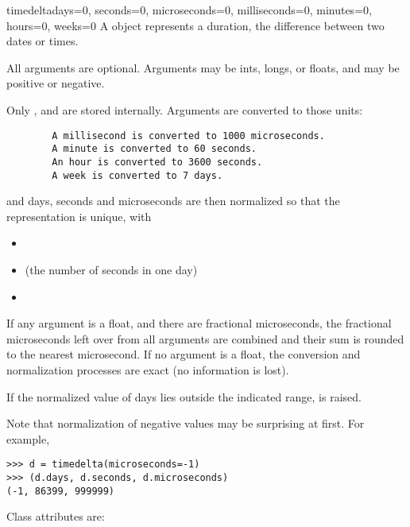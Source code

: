 \begin{classdesc}{timedelta}{days=0, seconds=0, microseconds=0,
                            milliseconds=0, minutes=0, hours=0, weeks=0}
A  object represents a duration, the difference
between two dates or times.

    All arguments are optional.  Arguments may be ints, longs, or floats,
    and may be positive or negative.

    Only ,  and  are stored
    internally.  Arguments are converted to those units:

\begin{verbatim}
        A millisecond is converted to 1000 microseconds.
        A minute is converted to 60 seconds.
        An hour is converted to 3600 seconds.
        A week is converted to 7 days.
\end{verbatim}

    and days, seconds and microseconds are then normalized so that the
    representation is unique, with

\begin{itemize}
  \item {}
  \item {} (the number of seconds in one day)
  \item {}
\end{itemize}

    If any argument is a float, and there are fractional microseconds,
    the fractional microseconds left over from all arguments are combined
    and their sum is rounded to the nearest microsecond.  If no
    argument is a float, the conversion and normalization processes
    are exact (no information is lost).

    If the normalized value of days lies outside the indicated range,
     is raised.

    Note that normalization of negative values may be surprising at first.
    For example,

\begin{verbatim}
>>> d = timedelta(microseconds=-1)
>>> (d.days, d.seconds, d.microseconds)
(-1, 86399, 999999)
\end{verbatim}

\end{classdesc}

Class attributes are:

